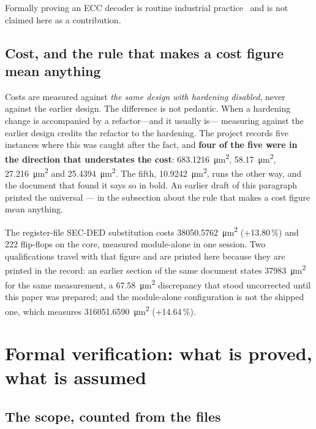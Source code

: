 \documentclass[11pt,a4paper]{article}
\begin{document}
Formally proving an ECC decoder is routine industrial
practice~\cite{kumar2023} and is not claimed here as a contribution.

\subsection{Cost, and the rule that makes a cost figure mean anything}

Costs are measured against \emph{the same design with hardening disabled},
never against the earlier design. The difference is not pedantic. When a
hardening change is accompanied by a refactor---and it usually is---
measuring against the earlier design credits the refactor to the
hardening. The project records five instances where this was caught after
the fact, and \textbf{four of the five were in the direction that
understates the cost}: \SI{683.1216}{\micro\meter\squared},
\SI{58.17}{\micro\meter\squared}, \SI{27.216}{\micro\meter\squared} and
\SI{25.4394}{\micro\meter\squared}. The fifth,
\SI{10.9242}{\micro\meter\squared}, runs the other way, and the document
that found it says so in bold. An earlier draft of this paragraph printed
the universal --- in the subsection about the rule that makes a cost
figure mean anything.

The register-file SEC-DED substitution costs
\SI{38050.5762}{\micro\meter\squared} (+13.80\,\%) and 222 flip-flops on
the core, measured module-alone in one session. Two qualifications travel
with that figure and are printed here because they are printed in the
record: an earlier section of the same document states
\SI{37983}{\micro\meter\squared} for the same measurement, a
\SI{67.58}{\micro\meter\squared} discrepancy that stood uncorrected until
this paper was prepared; and the module-alone configuration is not the
shipped one, which measures \SI{316051.6590}{\micro\meter\squared}
(+14.64\,\%).

\section{Formal verification: what is proved, what is assumed}
\label{sec:formal}

\subsection{The scope, counted from the files}
\end{document}
